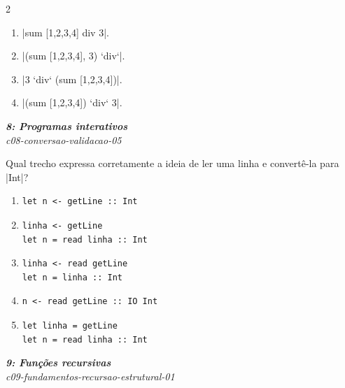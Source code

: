 \documentclass[a4paper,10pt,brazil]{article}
\begin{document}
\begin{multicols}{2}
\begin{enumerate}
  \item \haskellinline|sum [1,2,3,4] div 3|.

  \item \haskellinline|(sum [1,2,3,4], 3) `div`|.

  \item \haskellinline|3 `div` (sum [1,2,3,4])|.

  \item \haskellinline|(sum [1,2,3,4]) `div` 3|.


\end{enumerate}

\begin{flushright}
  \footnotesize
  \textit{\textbf{8: Programas interativos}}\\
  \textit{c08-conversao-validacao-05}\\

\end{flushright}
Qual trecho expressa corretamente a ideia de ler uma linha e convertê-la para \haskellinline|Int|?

\begin{enumerate}
  \item \begin{verbatim}
let n <- getLine :: Int
\end{verbatim}

  \item \begin{verbatim}
linha <- getLine
let n = read linha :: Int
\end{verbatim}

  \item \begin{verbatim}
linha <- read getLine
let n = linha :: Int
\end{verbatim}

  \item \begin{verbatim}
n <- read getLine :: IO Int
\end{verbatim}

  \item \begin{verbatim}
let linha = getLine
let n = read linha :: Int
\end{verbatim}


\end{enumerate}

\begin{flushright}
  \footnotesize
  \textit{\textbf{9: Funções recursivas}}\\
  \textit{c09-fundamentos-recursao-estrutural-01}\\


\end{flushright}
\end{multicols}
\end{document}
